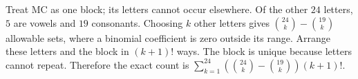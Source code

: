 Treat MC as one block; its letters cannot occur elsewhere. Of the other $24$ letters, $5$ are vowels and $19$ consonants. Choosing $k$ other letters gives $\binom{24}{k}-\binom{19}{k}$ allowable sets, where a binomial coefficient is zero outside its range. Arrange these letters and the block in $(k+1)!$ ways. The block is unique because letters cannot repeat. Therefore the exact count is $\boxed{\sum_{k=1}^{24}(\binom{24}{k}-\binom{19}{k})(k+1)!}$.
